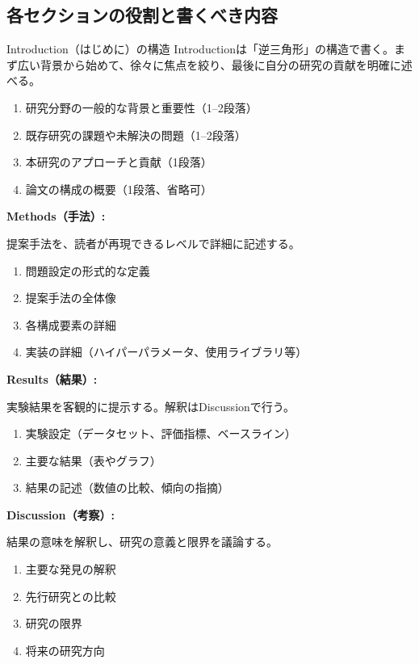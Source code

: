 \subsection{各セクションの役割と書くべき内容}

\begin{itembox}[l]{Introduction（はじめに）の構造}
Introductionは「逆三角形」の構造で書く。まず広い背景から始めて、徐々に焦点を絞り、最後に自分の研究の貢献を明確に述べる。
\begin{enumerate}
\item 研究分野の一般的な背景と重要性（1--2段落）
\item 既存研究の課題や未解決の問題（1--2段落）
\item 本研究のアプローチと貢献（1段落）
\item 論文の構成の概要（1段落、省略可）
\end{enumerate}
\end{itembox}

\textbf{Methods（手法）:}

提案手法を、読者が再現できるレベルで詳細に記述する。

\begin{enumerate}
\item 問題設定の形式的な定義
\item 提案手法の全体像
\item 各構成要素の詳細
\item 実装の詳細（ハイパーパラメータ、使用ライブラリ等）
\end{enumerate}

\textbf{Results（結果）:}

実験結果を客観的に提示する。解釈はDiscussionで行う。

\begin{enumerate}
\item 実験設定（データセット、評価指標、ベースライン）
\item 主要な結果（表やグラフ）
\item 結果の記述（数値の比較、傾向の指摘）
\end{enumerate}

\textbf{Discussion（考察）:}

結果の意味を解釈し、研究の意義と限界を議論する。

\begin{enumerate}
\item 主要な発見の解釈
\item 先行研究との比較
\item 研究の限界
\item 将来の研究方向
\end{enumerate}

